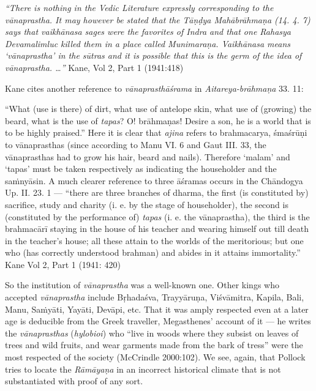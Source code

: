 \begin{myquote}
{{\sl “There is nothing in the Vedic Literature expressly corresponding to the vānaprastha. It may however be stated that the Tāṇḍya Mahābrāhmaṇa (14. 4. 7) says that {\sl vaikhānasa} sages were the favorites of Indra and that one Rahasya Devamalimluc killed them in a place called Munimaraṇa. Vaikhānasa means ‘vānaprastha’ in the sūtras and it is possible that this is the germ of the idea of vānaprastha. …”}}
\hfill  Kane, Vol 2, Part 1 (1941:418)
\end{myquote}

Kane cites another reference to {\sl vānaprasthāśrama} in {\sl Aitareya-brāhmaṇa} 33. 11:

\begin{myquote}
“What (use is there) of dirt, what use of antelope skin, what use of (growing) the beard, what is the use of {\sl tapas}? O! brāhmaṇas! Desire a son, he is a world that is to be highly praised.” Here it is clear that {\sl ajina} refers to brahmacarya, śmaśrūṇi to vānaprasthas (since according to Manu VI. 6 and Gaut III. 33, the vānaprasthas had to grow his hair, beard and nails). Therefore `malam’ and `tapas' must be taken respectively as indicating the householder and the saṁnyāsin. A much clearer reference to three āśramas occurs in the Chāndogya Up. II. 23. 1 --- “there are three branches of dharma, the first (is constituted by) sacrifice, study and charity (i. e. by the stage of householder), the second is (constituted by the performance of) {\sl tapas} (i. e. the vānaprastha), the third is the brahmacārī staying in the house of his teacher and wearing himself out till death in the teacher's house; all these attain to the worlds of the meritorious; but one who (has correctly understood brahman) and abides in it attains immortality.”
\hfill Kane Vol 2, Part 1 (1941: 420)
\end{myquote}

So the institution of {\sl vānaprastha} was a well-known one. Other kings who accepted {\sl vānaprastha} include Bṛhadaśva, Trayyāruṇa, Viśvāmitra, Kapila, Bali, Manu, Saṁyāti, Yayāti, Devāpi, etc. That it was amply respected even at a later age is deducible from the Greek traveller, Megasthenes’ account of it --- he writes the {\sl vānaprasthas} ({\sl hylobioi}) who “live in woods where they subsist on leaves of trees and wild fruits, and wear garments made from the bark of tress” were the most respected of the society (McCrindle 2000:102).  We see, again, that Pollock tries to locate the {\sl Rāmāyaṇa} in an incorrect historical climate that is not substantiated with proof of any sort.\\[-21pt] 

